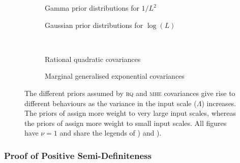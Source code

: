 \documentclass{article}
\renewcommand{\sc}[1]{{\scshape #1}}
\begin{document}
\begin{figure}
	\begin{subfigure}[b]{7cm}
		\caption{Gamma prior distributions for $1/L^2$}
		\label{fig:gamma_prior}
	\end{subfigure}
	\begin{subfigure}[b]{7cm}
		\caption{Gaussian prior distributions for $\log(L)$}
		 \label{fig:log_normal_prior}
	\end{subfigure}
 \\[0.2cm]
	\begin{subfigure}[b]{7cm}
		\caption{Rational quadratic covariances}
		\label{fig:RQ_cov}
	\end{subfigure}
	\begin{subfigure}[b]{7cm}
		\caption{Marginal generalised exponential covariances}
		 \label{fig:our_cov}
	\end{subfigure}
\caption{The different priors assumed by \sc{rq} and \sc{mhe} covariances give rise to different behaviours as the variance in the input scale ($\Lambda$) increases. The priors of  assign more weight to very large input scales, whereas the priors of  assign more weight to small input scales. All figures have $\nu = 1$ and share the legends of ) and ).}
\label{fig:rq_vs_our_cov}
\end{figure}


\subsubsection{Proof of Positive Semi-Definiteness}
\end{document}
